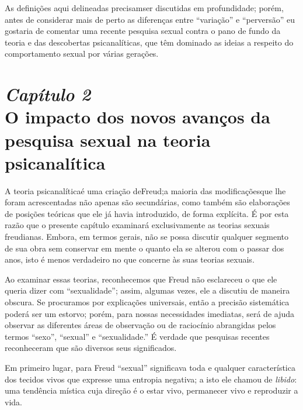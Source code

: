 As definições aqui delineadas precisam\idxpervdiagn[|)] ser discutidas em
profundidade; porém, antes de considerar mais de perto as diferenças
entre ``variação'' e ``perversão'' eu gostaria de comentar uma
recente pesquisa sexual contra o pano de fundo da teoria e das
descobertas psicanalíticas, que têm dominado as ideias a respeito do
comportamento sexual por várias gerações.




\chapter[\textbf{2}\quad O impacto dos novos avanços da pesquisa sexual\\\hspace*{6mm}
na teoria psicanalítica]{{\large\textit{Capítulo 2}}\\ O impacto dos novos avanços da pesquisa sexual na teoria psicanalítica}

A teoria psicanalítica\idxsexop[|(] é uma criação de\idxfreudsexua[|(] Freud;\idxfreud[|(] a \mbox{maioria} das
modificações\idxsexuateo[|(] que lhe foram acrescentadas não apenas são secundárias,
como também são elaborações de posições teóricas que ele já havia
introduzido, de forma explícita. É por esta razão que o presente
capítulo examinará exclusivamente as teorias sexuais freudianas.
Embora, em termos gerais, não se possa discutir qualquer segmento de
sua obra sem conservar em mente o quanto ela se alterou com o passar
dos anos, isto é menos verdadeiro no que concerne às suas teorias sexuais.

 Ao examinar essas teorias, reconhecemos que Freud não esclareceu o que
ele queria dizer com ``sexualidade''; assim,
algumas vezes, ele a discutiu de maneira obscura. Se procuramos por
explicações universais, então a precisão sistemática poderá ser um
estorvo; porém, para nossas necessidades imediatas, será de ajuda
observar as diferentes áreas de observação ou de raciocínio abrangidas
pelos termos ``sexo'', ``sexual'' e ``sexualidade.'' É verdade que pesquisas
recentes reconheceram que são diversos seus significados.

 Em primeiro lugar, para Freud ``sexual'' significava toda e qualquer característica dos tecidos vivos que
expresse uma entropia negativa; a isto ele chamou de \textit{libido}:\idxlibid{} uma tendência mística cuja direção é o estar vivo, permanecer vivo e reproduzir a vida.

